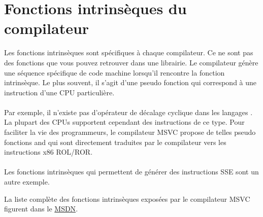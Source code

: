 ﻿\section{Fonctions intrinsèques du compilateur}
\label{sec:compiler_intrinsic}


Les fonctions intrinsèques sont spécifiques à chaque compilateur. Ce ne sont pas des fonctions que 
vous pouvez retrouver dans une librairie.
Le compilateur génère une séquence spécifique de code machine lorsqu'il rencontre la fonction 
intrinsèque. Le plus souvent, il s'agit d'une pseudo fonction qui correspond à une instruction d'une 
\ac{CPU} particulière. \\
\\
Par exemple, il n'existe pas d'opérateur de décalage cyclique dans les langages \CCpp. La plupart 
des \ac{CPU}s supportent cependant des instructions de ce type.
Pour faciliter la vie des programmeurs, le compilateur MSVC propose de telles pseudo fonctions
 and \FNMSDNROTxURL{}
qui sont directement traduites par le compilateur vers les instructions x86 ROL/ROR. \\
\\
Les fonctions intrinsèques qui permettent de générer des instructions SSE sont un autre exemple.

La liste complète des fonctions intrinsèques exposées par le compilateur MSVC figurent dans le 
\href{http://go.yurichev.com/17254}{MSDN}.

